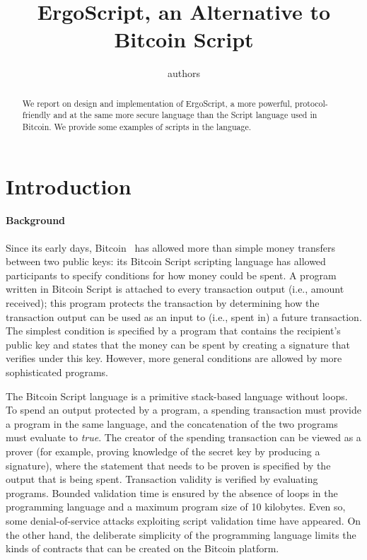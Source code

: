 \documentclass[11pt]{article}
\newcommand{\authnote}[2]{\marginpar{\parbox{\marginparwidth}{\tiny %
  \textsf{#1 {\textcolor{blue}{notes: #2}}}}}%
  \textcolor{blue}{\textbf{\dag}}}
\newcommand{\authnote}[2]{
  \textsf{#1 \textcolor{blue}{: #2}}}
\newcommand{\authnote}[2]{}
\newcommand{\knote}[1]{{\authnote{\textcolor{green}{kushti notes}}{#1}}}
\newcommand{\dnote}[1]{{\authnote{\textcolor{brown}{Dima notes}}{#1}}}
\newcommand{\langname}{ErgoScript\xspace}
\begin{document}
\title{\langname, an Alternative to Bitcoin Script}

\author{authors}


\maketitle


\begin{abstract}
\dnote{I don't like the title and abstract - it looks like we're proposing Bitcoin improvement via BIP, not a separate independent language - better to mention Bitcoin less}
We report on design and implementation of \langname, a more powerful, protocol-friendly and at the same more secure language than the  Script language used in Bitcoin. We provide some examples of scripts in the language.
\end{abstract}



\section{Introduction}
\paragraph{Background}

Since its early days, Bitcoin~\cite{Nak08} has allowed more than simple money transfers between two public keys: its Bitcoin Script scripting language has allowed participants to specify conditions for how money could be spent. A program written in Bitcoin Script is attached to every transaction output (i.e., amount received); this program protects the transaction by determining how the transaction output can be used as an input to (i.e., spent in) a future transaction. The simplest condition is specified by a program that contains the recipient's public key and states that the money can be spent by creating a signature that verifies under this key.  However, more general conditions are allowed by more sophisticated programs. 

The Bitcoin Script language is a primitive stack-based language without loops. To spend an output protected by a program, a spending transaction must provide a program in the same language, and the concatenation of the two programs must evaluate to \emph{true}. The creator of the spending transaction can be viewed as a prover (for example, proving knowledge of the secret key by producing a signature), where the statement that needs to be proven is specified by the output that is being spent. Transaction validity is verified by evaluating programs. Bounded validation time is ensured by the absence of loops in the programming language and a maximum program size of 10 kilobytes. Even so, some denial-of-service attacks exploiting script validation time have appeared. \knote{links} On the other hand, the deliberate simplicity of the programming language limits the kinds of contracts that can be created on the Bitcoin platform.
\end{document}
